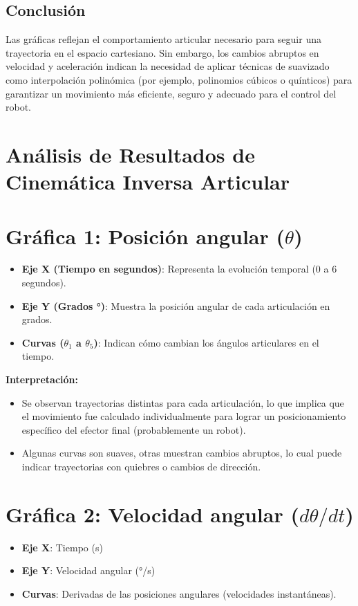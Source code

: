 \subsection*{Conclusión}
Las gráficas reflejan el comportamiento articular necesario para seguir una trayectoria en el espacio cartesiano. Sin embargo, los cambios abruptos en velocidad y aceleración
indican la necesidad de aplicar técnicas de suavizado como interpolación polinómica (por ejemplo, polinomios cúbicos o quínticos) para garantizar un movimiento más eficiente, seguro y adecuado para el control del robot.


\section*{Análisis de Resultados de Cinemática Inversa Articular}
	
	\section*{Gráfica 1: Posición angular ($\theta$)}
	
	\begin{itemize}
		\item \textbf{Eje X (Tiempo en segundos)}: Representa la evolución temporal (0 a 6 segundos).
		\item \textbf{Eje Y (Grados °)}: Muestra la posición angular de cada articulación en grados.
		\item \textbf{Curvas ($\theta_1$ a $\theta_5$)}: Indican cómo cambian los ángulos articulares en el tiempo.
	\end{itemize}
	
	\textbf{Interpretación:}
	\begin{itemize}
		\item Se observan trayectorias distintas para cada articulación, lo que implica que el movimiento fue calculado individualmente para lograr un posicionamiento específico del efector final (probablemente un robot).
		\item Algunas curvas son suaves, otras muestran cambios abruptos, lo cual puede indicar trayectorias con quiebres o cambios de dirección.
	\end{itemize}
	
	
	\section*{Gráfica 2: Velocidad angular ($d\theta/dt$)}
	
	\begin{itemize}
		\item \textbf{Eje X}: Tiempo (s)
		\item \textbf{Eje Y}: Velocidad angular (°/s)
		\item \textbf{Curvas}: Derivadas de las posiciones angulares (velocidades instantáneas).
	\end{itemize}
	
